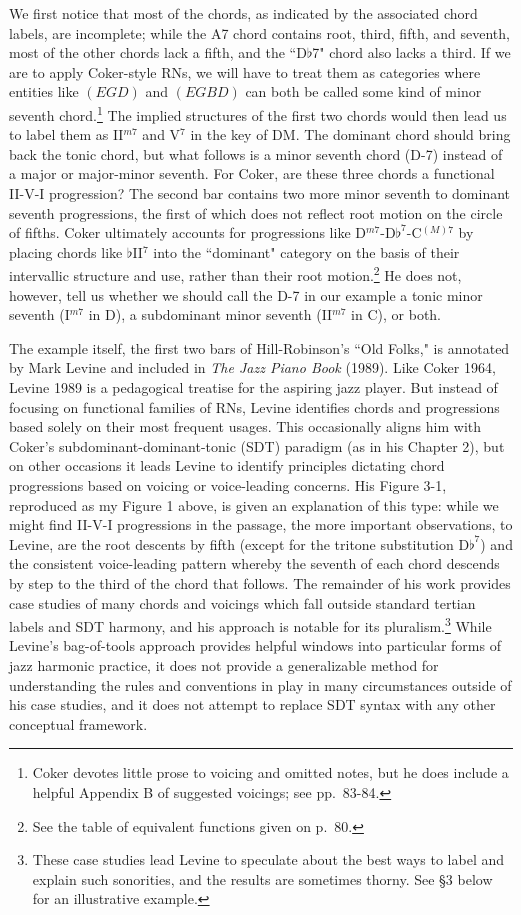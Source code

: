 We first notice that most of the chords, as indicated by the associated chord labels, are incomplete; while the A7 chord contains root, third, fifth, and seventh, most of the other chords lack a fifth, and the ``D$\flat$7" chord also lacks a third.  If we are to apply Coker-style RNs, we will have to treat them as categories where entities like $(EGD)$ and $(EGBD)$ can both be called some kind of minor seventh chord.\footnote{Coker devotes little prose to voicing and omitted notes, but he does include a helpful Appendix B of suggested voicings; see pp.\ 83-84.}  The implied structures of the first two chords would then lead us to label them as II$^{m7}$ and V$^7$ in the key of DM.  The dominant chord should bring back the tonic chord, but what follows is a minor seventh chord (D-7) instead of a major or major-minor seventh.  For Coker, are these three chords a functional II-V-I progression?  The second bar contains two more minor seventh to dominant seventh progressions, the first of which does not reflect root motion on the circle of fifths.  Coker ultimately accounts for progressions like D$^{m7}$-D$\flat^7$-C$^{(M)7}$ by placing chords like $\flat$II$^7$ into the ``dominant" category on the basis of their intervallic structure and use, rather than their root motion.\footnote{See the table of equivalent functions given on p.\ 80.}  He does not, however, tell us whether we should call the D-7 in our example a tonic minor seventh (I$^{m7}$ in D), a subdominant minor seventh (II$^{m7}$ in C), or both.

The example itself, the first two bars of Hill-Robinson's ``Old Folks," is annotated by Mark Levine and included in \emph{The Jazz Piano Book} (1989).  Like Coker 1964, Levine 1989 is a pedagogical treatise for the aspiring jazz player.  But instead of focusing on functional families of RNs, Levine identifies chords and progressions based solely on their most frequent usages.  This occasionally aligns him with Coker's subdominant-dominant-tonic (SDT) paradigm (as in his Chapter 2), but on other occasions it leads Levine to identify principles dictating chord progressions based on voicing or voice-leading concerns.  His Figure 3-1, reproduced as my Figure 1 above, is given an explanation of this type: while we might find II-V-I progressions in the passage, the more important observations, to Levine, are the root descents by fifth (except for the tritone substitution D$\flat^7$) and the consistent voice-leading pattern whereby the seventh of each chord descends by step to the third of the chord that follows.  The remainder of his work provides case studies of many chords and voicings which fall outside standard tertian labels and SDT harmony, and his approach is notable for its pluralism.\footnote{These case studies lead Levine to speculate about the best ways to label and explain such sonorities, and the results are sometimes thorny.  See \S 3 below for an illustrative example.}  While Levine's bag-of-tools approach provides helpful windows into particular forms of jazz harmonic practice, it does not provide a generalizable method for understanding the rules and conventions in play in many circumstances outside of his case studies, and it does not attempt to replace SDT syntax with any other conceptual framework.

